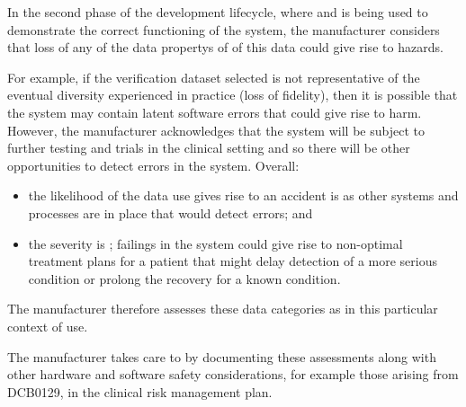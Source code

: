 In the second phase of the development lifecycle, where  and  is being used to demonstrate the correct functioning of the system, the manufacturer considers that loss of any of the \glspl{data property} of  of this data could give rise to \glspl{hazard}.

For example, if the \gls{verification} \gls{dataset} selected is not representative of the eventual diversity experienced in practice (loss of \gls{fidelity}), then it is possible that the system may contain latent software errors that could give rise to harm. However, the manufacturer acknowledges that the system will be subject to further testing and trials in the clinical setting and so there will be other opportunities to detect errors in the system. Overall:
\begin{itemize}
  \item the likelihood of the data use gives rise to an accident is  as other systems and processes are in place that would detect errors; and
  \item the severity is ; failings in the system could give rise to non-optimal treatment plans for a patient that might delay detection of a more serious condition or prolong the recovery for a known condition.
\end{itemize}

The manufacturer therefore assesses these data categories as  in this particular context of use.

The manufacturer takes care to  by documenting these assessments along with other hardware and software safety considerations, for example those arising from DCB0129, in the clinical risk management plan.


